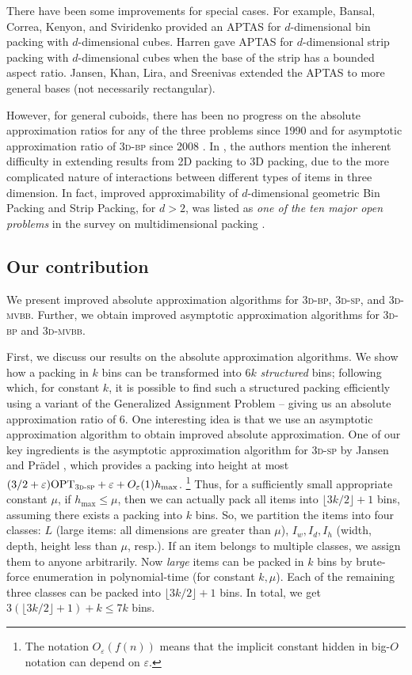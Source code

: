 \documentclass[a4paper,UKenglish,cleveref, autoref, thm-restate]{lipics-v2021}
\newcommand{\eps}{\varepsilon}
\newcommand{\opt}{\mathrm{OPT}}
\newcommand{\tbp}{\textsc{3d-bp}\xspace}
\newcommand{\tsp}{\textsc{3d-sp}\xspace}
\newcommand{\tmvc}{\textsc{3d-mvbb}\xspace}
\begin{document}
There have been some improvements for special cases. 
For example, Bansal, Correa, Kenyon, and Sviridenko \cite{bansal2006bin} provided an APTAS for $d$-dimensional bin packing with $d$-dimensional cubes. 
Harren \cite{Harren09} gave APTAS for $d$-dimensional strip packing with $d$-dimensional cubes when the base of the strip has a bounded aspect ratio. 
Jansen, Khan, Lira, and Sreenivas \cite{Jansen0LS22} extended the APTAS to more general bases (not necessarily rectangular).

However, for general cuboids, there has been no progress on the absolute approximation ratios for any of the three problems since 1990 \cite{li-cheng} and for asymptotic approximation ratio of \tbp since 2008 \cite{caprara2008packing}.
In \cite{bansal2006bin}, the authors mention the inherent difficulty in extending results from 2D packing to 3D packing, due to the more complicated nature of interactions between different types of items in three dimension. 
In fact, improved approximability of $d$-dimensional geometric Bin Packing and Strip Packing, for $d>2$, was listed as {\em one of the ten major open problems} in the survey on multidimensional packing \cite{christensen2016multidimensional}.


\subsection{Our contribution}


We present improved absolute approximation algorithms for \tbp, \tsp, and \tmvc. Further, we obtain improved asymptotic approximation algorithms for \tbp and \tmvc. 

First, we discuss our results on the absolute approximation algorithms. 
We show how a packing in $k$ bins can be transformed into $6k$ {\em structured} bins; following which, for constant $k$, it is possible to find such a structured packing efficiently using a variant of the Generalized Assignment Problem -- giving us an absolute approximation ratio of 6.
One interesting idea is that we use an asymptotic approximation algorithm to obtain improved absolute approximation.
One of our key ingredients is the asymptotic approximation algorithm for \tsp by Jansen and Pr{\"{a}}del \cite{jansen2006asymptotic}, which provides a packing into height at most $(3/2+\varepsilon)\opt_{\tsp}+\varepsilon + O_{\varepsilon}(1)h_{\text{max}}$. \footnote{The notation $O_{\eps}(f(n))$ means that the implicit constant hidden in big-$O$ notation can depend on $\eps$.} 
Thus, for a sufficiently small appropriate constant $\mu$, if $h_{\text{max}}\le \mu$, then we can actually pack all items into $\lfloor 3k/2 \rfloor+1$ bins, assuming there exists a packing into $k$ bins. So, we partition the items into four classes: $L$ (large items: all dimensions are greater than $\mu$), $I_w, I_d, I_h$ (width, depth, height less than $\mu$, resp.).  If an item belongs to multiple classes, we assign them to anyone arbitrarily.
Now {\em large} items can be packed in $k$ bins by brute-force enumeration in polynomial-time (for constant $k,\mu$). 
Each of the remaining three classes can be packed into $\lfloor 3k/2 \rfloor+1$ bins. In total, we get $3(\lfloor 3k/2 \rfloor+1)+k\le 7k$ bins.
\end{document}
